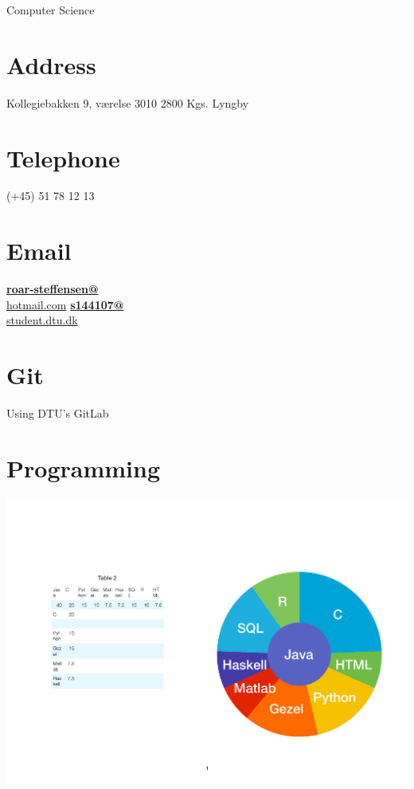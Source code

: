 \documentclass[]{friggeri-cv}
\begin{document}
      {Computer Science}
      

\begin{aside}
  \section{Address}
    Kollegiebakken 9, 
    værelse 3010
    2800 Kgs. Lyngby
    ~
  \section{Telephone}
    (+45) 51 78 12 13
    ~
  \section{Email}
    \href{mailto:roar-steffensen@hotmail.com}{\textbf{roar-steffensen@}\\hotmail.com}
    \href{mailto:s144107@student.dtu.dk}{\textbf{s144107@}\\student.dtu.dk}
    ~
  \section{Git}
    Using DTU's GitLab
    ~
  \section{Programming}
    \includegraphics[width=\linewidth]{img/programmeringschart}
    ~

\end{aside}
\end{document}
